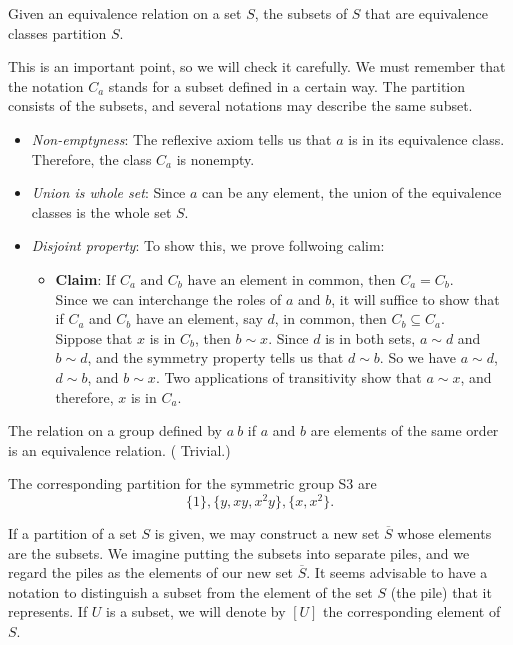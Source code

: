 \documentclass[
]{book}
\providecommand{\tightlist}{%
  \setlength{\itemsep}{0pt}\setlength{\parskip}{0pt}}
\begin{document}
\leavevmode{}%
Given an equivalence relation on a set \(S\), the subsets of \(S\) that
are equivalence classes partition \(S\).

This is an important point, so we will check it carefully. We must
remember that the notation \(C_a\) stands for a subset defined in a
certain way. The partition consists of the subsets, and several
notations may describe the same subset.

\begin{itemize}
\item
  \emph{Non-emptyness}: The reflexive axiom tells us that \(a\) is in
  its equivalence class. Therefore, the class \(C_a\) is nonempty.
\item
  \emph{Union is whole set}: Since \(a\) can be any element, the union
  of the equivalence classes is the whole set \(S\).
\item
  \emph{Disjoint property}: To show this, we prove follwoing calim:

  \begin{itemize}
  \tightlist
  \item
    \textbf{Claim}:
    \(\text{If } C_a \text{ and } C_b \text{ have an element in common, then } C_a = C_b\).\\
    Since we can interchange the roles of \(a\) and \(b\), it will
    suffice to show that if \(C_a\) and \(C_b\) have an element, say
    \(d\), in common, then \(C_b \subseteq C_a\).\\
    Sippose that \(x\) is in \(C_b\), then \(b \sim x\). Since \(d\) is
    in both sets, \(a \sim d\) and \(b \sim d\), and the symmetry
    property tells us that \(d \sim b\). So we have \(a \sim d\),
    \(d \sim b\), and \(b \sim x\). Two applications of transitivity
    show that \(a \sim x\), and therefore, \(x\) is in \(C_a\).
  \end{itemize}
\end{itemize}

\leavevmode{}%
The relation on a group defined by \(a ~ b\) if \(a\) and \(b\) are
elements of the same order is an equivalence relation. ( Trivial.)

The corresponding partition for the symmetric group S3 are
\[\{1\}, \{y, xy, x^2y\}, \{x, x^2\}.\]

If a partition of a set \(S\) is given, we may construct a new set
\(\overline{S}\) whose elements are the subsets. We imagine putting the
subsets into separate piles, and we regard the piles as the elements of
our new set \(\overline{S}\). It seems advisable to have a notation to
distinguish a subset from the element of the set \(S\) (the pile) that
it represents. If \(U\) is a subset, we will denote by \([U]\) the
corresponding element of \(S\).
\end{document}
